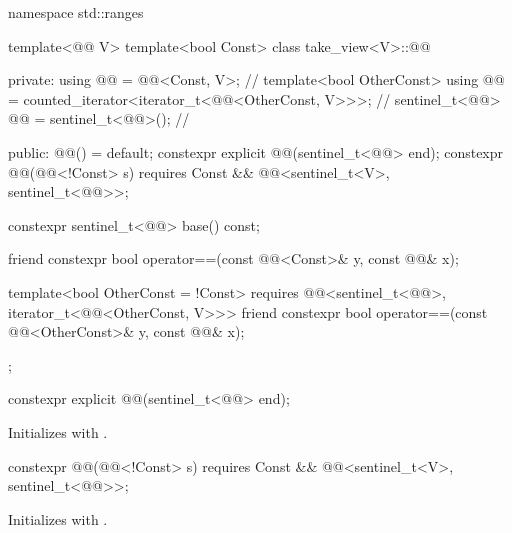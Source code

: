\begin{codeblock}
namespace std::ranges {
  template<@@ V>
  template<bool Const>
  class take_view<V>::@@ {
  private:
    using @@ = @@<Const, V>;                                     // \expos
    template<bool OtherConst>
      using @@ = counted_iterator<iterator_t<@@<OtherConst, V>>>;  // \expos
    sentinel_t<@@> @@ = sentinel_t<@@>();                             // \expos

  public:
    @@() = default;
    constexpr explicit @@(sentinel_t<@@> end);
    constexpr @@(@@<!Const> s)
      requires Const && @@<sentinel_t<V>, sentinel_t<@@>>;

    constexpr sentinel_t<@@> base() const;

    friend constexpr bool operator==(const @@<Const>& y, const @@& x);

    template<bool OtherConst = !Const>
      requires @@<sentinel_t<@@>, iterator_t<@@<OtherConst, V>>>
    friend constexpr bool operator==(const @@<OtherConst>& y, const @@& x);
  };
}
\end{codeblock}

%
\begin{itemdecl}
constexpr explicit @@(sentinel_t<@@> end);
\end{itemdecl}

\begin{itemdescr}
\pnum
\effects
Initializes  with .
\end{itemdescr}

%
\begin{itemdecl}
constexpr @@(@@<!Const> s)
  requires Const && @@<sentinel_t<V>, sentinel_t<@@>>;
\end{itemdecl}

\begin{itemdescr}
\pnum
\effects
Initializes  with .
\end{itemdescr}


